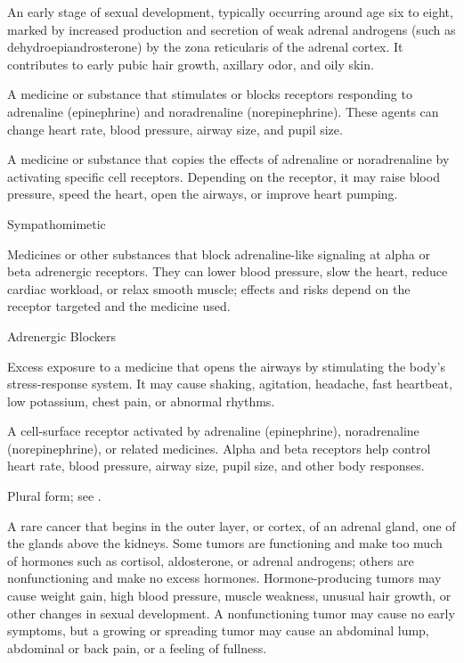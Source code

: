  An early stage of sexual development, typically occurring around age six to eight, marked by increased production and secretion of weak adrenal androgens (such as dehydroepiandrosterone) by the zona reticularis of the adrenal cortex. It contributes to early pubic hair growth, axillary odor, and oily skin.

 A medicine or substance that stimulates or blocks receptors responding to adrenaline (epinephrine) and noradrenaline (norepinephrine). These agents can change heart rate, blood pressure, airway size, and pupil size.

 A medicine or substance that copies the effects of adrenaline or noradrenaline by activating specific cell receptors. Depending on the receptor, it may raise blood pressure, speed the heart, open the airways, or improve heart pumping.

\synonyms
Sympathomimetic

 Medicines or other substances that block adrenaline-like signaling at alpha or beta adrenergic receptors. They can lower blood pressure, slow the heart, reduce cardiac workload, or relax smooth muscle; effects and risks depend on the receptor targeted and the medicine used.

\synonyms
Adrenergic Blockers

 Excess exposure to a medicine that opens the airways by stimulating the body’s stress-response system. It may cause shaking, agitation, headache, fast heartbeat, low potassium, chest pain, or abnormal rhythms.

 A cell-surface receptor activated by adrenaline (epinephrine), noradrenaline (norepinephrine), or related medicines. Alpha and beta receptors help control heart rate, blood pressure, airway size, pupil size, and other body responses.

 Plural form; see .

 A rare cancer that begins in the outer layer, or cortex, of an adrenal gland, one of the glands above the kidneys. Some tumors are functioning and make too much of hormones such as cortisol, aldosterone, or adrenal androgens; others are nonfunctioning and make no excess hormones. Hormone-producing tumors may cause weight gain, high blood pressure, muscle weakness, unusual hair growth, or other changes in sexual development. A nonfunctioning tumor may cause no early symptoms, but a growing or spreading tumor may cause an abdominal lump, abdominal or back pain, or a feeling of fullness.

